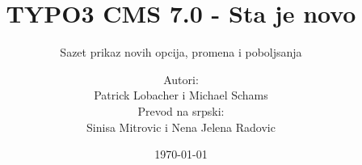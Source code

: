 %

%
%

\documentclass[t]{beamer}

\beamertemplatenavigationsymbolsempty

{
	\usetheme{typo3slides}
}

\title{TYPO3 CMS 7.0 - Sta je novo}
\subtitle{Sazet prikaz novih opcija, promena i poboljsanja}
\author{
	\centerline{Autori:}
	\centerline{Patrick Lobacher i Michael Schams}
	\vspace{0.4cm}
	\centerline{Prevod na srpski:}
	\centerline{Sinisa Mitrovic i Nena Jelena Radovic}
}

\date{\today}



\sharefont


\begingroup
	[default]
	\begin{frame}
		\titlepage
	\end{frame}
\endgroup



\section*{TYPO3 CMS 7.0 - Sta je novo}
\begin{frame}[fragile]
	\frametitle{Sadrzaj}
	\framesubtitle{Sadrzaj}

	\begin{multicols}{2}
		\tableofcontents
	\end{multicols}

\end{frame}

